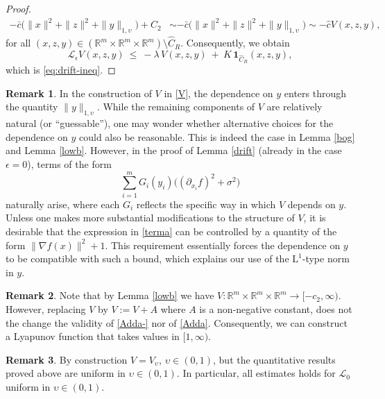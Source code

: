 \documentclass[11pt, a4paper,leqno]{amsart}
\theoremstyle{definition}
\newtheorem{remark}{Remark}[section]
\numberwithin{equation}{section}
\newcommand{\R}{\mathbb R}
\begin{document}
\begin{proof}
\begin{align}\label{Adda}
-\bar c \bigl(\|x\|^2+\|z\|^2+\|y\|_{1,\upsilon}\bigr) + C_2&\sim -\bar c \bigl(\|x\|^2+\|z\|^2+\|y\|_{1,\upsilon}\bigr)\sim -\hat  cV(x,z,y),
\end{align}
for all $(x,z,y)\in (\R^{m}\times \R^m\times \R^m)\setminus \hat C_R$. Consequently,
we obtain
\[
\mathcal L_\epsilon V(x,z,y)\ \le\ -\lambda\,V(x,z,y)\ +\ K\,\mathbf 1_{\hat C_R}(x,z,y),
\]
which is \eqref{eq:drift-ineq}.
\end{proof}




\begin{remark}\label{uurem-a-}
In the construction of $V$ in \eqref{V}, the dependence on $y$ enters through the quantity $\|y\|_{1,\upsilon}$. While the remaining components of $V$ are relatively natural (or ``guessable''), one may wonder whether alternative choices for the dependence on $y$ could also be reasonable. This is indeed the case in Lemma \ref{bog} and Lemma \ref{lowb}. However, in the proof of Lemma \ref{drift} (already in the case $\epsilon=0$), terms of the form
\begin{equation}\label{terma}
\sum_{i=1}^m G_i(y_i)\big((\partial_{x_i} f)^2 + \sigma^2\big)
\end{equation}
naturally arise, where each $G_i$ reflects the specific way in which $V$ depends on $y$. Unless one makes more substantial modifications to the structure of $V$, it is desirable that the expression in \eqref{terma} can be controlled by a quantity of the form $\|\nabla f(x)\|^2 + 1$. This requirement essentially forces the dependence on $y$ to be compatible with such a bound, which explains our use of the $\mathrm{L}^1$-type norm in $y$.
\end{remark}

\begin{remark}\label{uurem} Note that by Lemma \ref{lowb} we have  $V:\R^{m}\times \R^m\times \R^m\to [-c_2,\infty)$. However, replacing
$V$ by $V:=V+A$ where $A$ is a non-negative constant, does not the change the validity of \eqref{Adda-} nor of \eqref{Adda}. Consequently,  we can construct a Lyapunov function that takes values in $[1,\infty)$.
\end{remark}

\begin{remark}\label{uuremla} By construction $V=V_\upsilon$, $\upsilon\in (0,1)$, but  the
quantitative results proved above are uniform in $\upsilon\in (0,1)$. In particular, all estimates holds for $\mathcal{L}_0$ uniform in $\upsilon\in (0,1)$.
\end{remark}
\end{document}
